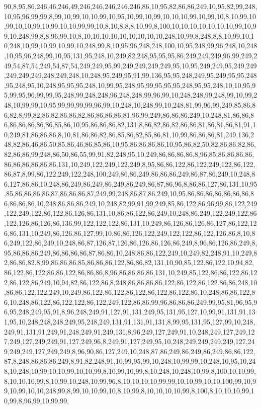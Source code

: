 90,8,95,86,246,46,246,49,246,246,246,246,246,86,10,95,82,86,86,249,10,95,82,99,248,10,95,96,99,99,8,99,10,99,10,10,99,10,95,10,99,10,99,10,10,10,99,10,99,10,8,10,99,10,99,10,10,99,10,99,10,10,99,99,10,8,10,8,8,8,10,99,8,100,10,10,10,10,10,10,10,99,10,99,10,248,99,8,8,96,99,10,8,10,10,10,10,10,10,10,10,10,248,10,99,8,248,8,8,10,99,10,10,248,10,99,10,99,10,99,10,248,99,8,10,95,96,248,248,100,10,95,248,99,96,248,10,248,10,95,96,248,99,10,95,131,95,248,10,249,82,248,95,95,95,86,249,249,249,96,99,249,249,54,87,54,249,54,87,54,249,249,95,99,249,249,249,249,95,10,95,249,249,95,249,249,249,249,249,248,249,248,10,248,95,249,95,91,99,136,95,95,248,249,95,249,95,95,248,95,248,95,10,248,95,95,95,248,10,99,95,248,95,99,95,95,95,248,95,95,248,10,10,95,95,99,95,96,99,99,95,248,99,248,248,96,248,248,99,96,99,10,248,248,99,248,99,10,99,248,10,99,99,10,95,99,99,99,99,96,99,10,248,10,248,99,10,248,81,99,96,99,249,85,86,86,82,8,99,82,86,82,86,86,82,86,86,86,86,81,96,99,249,86,86,86,249,10,248,81,86,86,86,86,86,86,86,86,85,86,10,95,86,86,86,82,131,8,86,82,86,82,86,86,81,86,81,86,81,91,10,249,81,86,86,86,8,10,81,86,86,82,86,85,86,82,85,86,81,10,99,86,86,86,81,249,136,248,82,86,46,86,50,85,86,46,86,85,86,10,95,86,86,86,86,10,95,86,82,50,82,86,86,82,86,82,86,86,99,248,86,50,86,55,99,91,82,248,95,10,249,86,86,86,86,8,96,85,86,86,86,86,86,86,86,86,86,86,131,10,249,122,249,122,249,8,95,86,86,122,86,122,249,122,86,122,86,87,8,99,86,122,249,122,248,100,249,86,86,249,86,86,86,249,86,87,86,249,10,248,86,127,86,86,10,248,86,249,86,249,86,249,86,249,86,87,86,96,8,86,86,127,86,131,10,95,85,86,86,86,86,87,86,86,86,87,249,99,248,86,87,86,249,10,95,86,86,86,86,86,86,86,86,86,86,86,10,248,86,86,86,249,10,248,82,99,91,99,249,85,86,122,86,96,99,86,122,249,122,249,122,86,122,86,126,86,131,10,86,86,122,86,249,10,248,86,249,122,249,122,86,122,126,86,126,86,136,99,122,122,122,86,131,10,249,86,126,86,126,86,127,86,122,126,86,131,10,249,86,126,86,127,99,10,86,86,126,122,249,122,122,86,122,126,86,8,10,86,249,122,86,249,10,248,86,87,126,87,126,86,126,86,126,86,249,8,96,86,126,86,249,8,95,86,86,86,249,86,86,86,86,87,86,86,10,248,86,86,122,249,10,249,82,248,91,10,249,82,86,86,82,8,99,86,86,86,85,86,86,86,122,86,86,82,131,10,90,85,122,86,122,10,94,82,86,122,86,122,86,86,122,86,86,86,8,96,86,86,86,86,131,10,249,85,122,86,86,122,86,122,86,122,86,249,10,94,82,86,122,86,8,248,86,86,86,86,122,86,122,86,122,86,86,248,10,86,86,122,122,249,10,249,86,122,86,122,86,122,86,122,86,122,86,10,248,86,86,122,86,10,248,86,122,86,122,122,86,122,249,122,86,86,99,96,86,86,86,249,99,95,81,96,95,96,95,248,249,95,91,8,96,248,249,91,127,91,131,249,95,131,95,127,10,99,91,131,91,131,95,10,248,248,248,249,95,248,249,131,91,131,91,131,8,99,95,131,95,127,99,10,248,249,91,131,91,249,91,248,249,91,249,131,8,96,249,127,249,91,10,248,249,127,249,127,249,127,249,249,91,127,249,96,8,249,91,127,249,95,10,248,249,249,249,249,127,249,249,249,127,249,249,8,96,90,86,127,249,10,248,87,86,249,86,249,86,249,86,86,122,87,8,248,86,86,86,249,8,91,82,248,91,10,99,95,99,10,248,10,99,99,10,248,10,95,10,248,10,248,10,99,10,10,99,10,10,99,8,10,99,10,99,8,10,248,10,248,10,99,8,100,10,10,99,8,10,10,10,99,8,10,99,10,248,10,99,96,8,10,10,10,10,99,99,10,10,99,10,10,100,99,10,99,10,99,10,10,248,99,8,99,10,10,99,10,8,10,99,8,10,10,10,10,99,8,100,8,10,10,10,99,10,99,8,96,99,10,99,99,